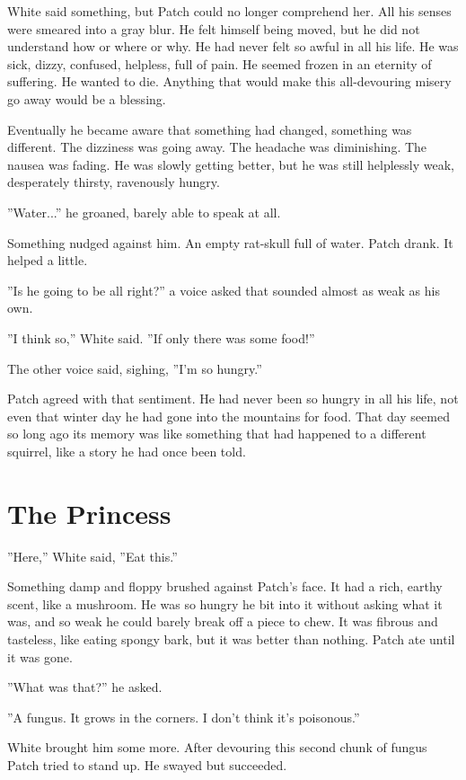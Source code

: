 \documentclass[12pt]{book}
\begin{document}
White said something, but Patch could no longer comprehend her. All his senses were smeared into a gray blur. He felt himself being moved, but he did not understand how or where or why. He had never felt so awful in all his life. He was sick, dizzy, confused, helpless, full of pain. He seemed frozen in an eternity of suffering. He wanted to die. Anything that would make this all-devouring misery go away would be a blessing.

Eventually he became aware that something had changed, something was different. The dizziness was going away. The headache was diminishing. The nausea was fading. He was slowly getting better, but he was still helplessly weak, desperately thirsty, ravenously hungry.

''Water...'' he groaned, barely able to speak at all.

Something nudged against him. An empty rat-skull full of water. Patch drank. It helped a little.

''Is he going to be all right?'' a voice asked that sounded almost as weak as his own.

''I think so,'' White said. ''If only there was some food!''

The other voice said, sighing, ''I'm so hungry.''

Patch agreed with that sentiment. He had never been so hungry in all his life, not even that winter day he had gone into the mountains for food. That day seemed so long ago its memory was like something that had happened to a different squirrel, like a story he had once been told.


\section{The Princess}

''Here,'' White said, ''Eat this.''

Something damp and floppy brushed against Patch's face. It had a rich, earthy scent, like a mushroom. He was so hungry he bit into it without asking what it was, and so weak he could barely break off a piece to chew. It was fibrous and tasteless, like eating spongy bark, but it was better than nothing. Patch ate until it was gone.

''What was that?'' he asked.

''A fungus. It grows in the corners. I don't think it's poisonous.''

White brought him some more. After devouring this second chunk of fungus Patch tried to stand up. He swayed but succeeded.
\end{document}
